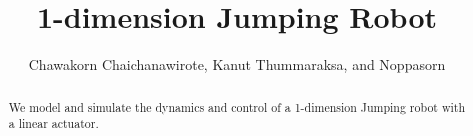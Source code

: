 \documentclass[12pt, a4paper]{report}
\title{1-dimension Jumping Robot}
\author{Chawakorn Chaichanawirote, Kanut Thummaraksa, and Noppasorn}
\begin{document}
\maketitle

\begin{abstract}
We model and simulate the dynamics and control of a 1-dimension Jumping robot with a linear actuator.
\end{abstract}
\end{document}
